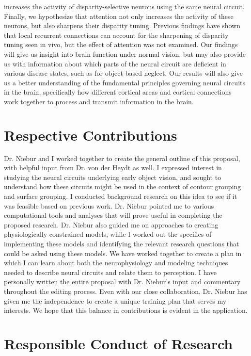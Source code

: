 \documentclass[11pt,notitlepage]{article}
\begin{document}
increases the activity of disparity-selective neurons using the same
neural circuit. Finally, we hypothesize that attention not only
increases the activity of these neurons, but also sharpens their
disparity tuning. Previous findings have shown that local recurrent
connections can account for the sharpening of disparity tuning seen in
vivo, but the effect of attention was not examined. Our findings will
give us insight into brain function under normal vision, but may also
provide us with information about which parts of the neural circuit
are deficient in various disease states, such as for object-based
neglect. Our results will also give us a better understanding of the
fundamental principles governing neural circuits in the brain,
specifically how different cortical areas and cortical connections
work together to process and transmit information in the brain.

\clearpage

\section*{Respective Contributions}

Dr. Niebur and I worked together to create the general outline of this
proposal, with helpful input from Dr. von der Heydt as well. I
expressed interest in studying the neural circuits underlying early
object vision, and sought to understand how these circuits might be
used in the context of contour grouping and surface grouping. I
conducted background research on this idea to see if it was feasible
based on previous work. Dr. Niebur pointed me to various computational
tools and analyses that will prove useful in completing the proposed
research. Dr. Niebur also guided me on approaches to creating
physiologically-constrained models, while I worked out the specifics
of implementing these models and identifying the relevant research
questions that could be asked using these models. We have worked
together to create a plan in which I can learn about both the
neurophysiology and modeling techniques needed to describe neural
circuits and relate them to perception. I have personally written the
entire proposal with Dr. Niebur's input and commentary throughout the
editing process. Even with our close collaboration, Dr. Niebur has
given me the independence to create a unique training plan that serves
my interests. We hope that this balance in contributions is evident in
the application. 

\clearpage

\section*{Responsible Conduct of Research}
\end{document}
